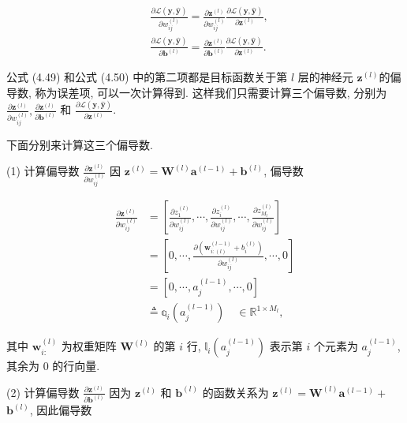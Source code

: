 \documentclass[10pt]{article}
\begin{document}
\begin{align*}
& \frac{\partial \mathcal{L}(\boldsymbol{y}, \hat{\boldsymbol{y}})}{\partial w_{i j}^{(l)}}=\frac{\partial \boldsymbol{z}^{(l)}}{\partial w_{i j}^{(l)}} \frac{\partial \mathcal{L}(\boldsymbol{y}, \hat{\boldsymbol{y}})}{\partial \boldsymbol{z}^{(l)}},  \tag{4.49}\\
& \frac{\partial \mathcal{L}(\boldsymbol{y}, \hat{\boldsymbol{y}})}{\partial \boldsymbol{b}^{(l)}}=\frac{\partial \boldsymbol{z}^{(l)}}{\partial \boldsymbol{b}^{(l)}} \frac{\partial \mathcal{L}(\boldsymbol{y}, \hat{\boldsymbol{y}})}{\partial \boldsymbol{z}^{(l)}} . \tag{4.50}
\end{align*}


公式 (4.49) 和公式 (4.50) 中的第二项都是目标函数关于第 $l$ 层的神经元 $\boldsymbol{z}^{(l)}$的偏导数, 称为误差项, 可以一次计算得到. 这样我们只需要计算三个偏导数, 分别为 $\frac{\partial \boldsymbol{z}^{(l)}}{\partial w_{i j}^{(l)}}, \frac{\partial \boldsymbol{z}^{(l)}}{\partial \boldsymbol{b}^{(l)}}$ 和 $\frac{\partial \mathcal{L}(\boldsymbol{y}, \hat{\boldsymbol{y}})}{\partial \boldsymbol{z}^{(l)}}$.

下面分别来计算这三个偏导数.

(1) 计算偏导数 $\frac{\partial \boldsymbol{z}^{(l)}}{\partial w_{i j}^{(l)}}$ 因 $\boldsymbol{z}^{(l)}=\boldsymbol{W}^{(l)} \boldsymbol{a}^{(l-1)}+\boldsymbol{b}^{(l)}$, 偏导数


\begin{align*}
\frac{\partial \boldsymbol{z}^{(l)}}{\partial w_{i j}^{(l)}} & =\left[\frac{\partial z_{1}^{(l)}}{\partial w_{i j}^{(l)}}, \cdots, \frac{\partial z_{i}^{(l)}}{\partial w_{i j}^{(l)}}, \cdots, \frac{\partial z_{M_{l}}^{(l)}}{\partial w_{i j}^{(l)}}\right]  \tag{4.51}\\
& =\left[0, \cdots, \frac{\partial\left(\boldsymbol{w}_{i:(l)}^{(l-1)}+b_{i}^{(l)}\right)}{\partial w_{i j}^{(l)}}, \cdots, 0\right]  \tag{4.52}\\
& =\left[0, \cdots, a_{j}^{(l-1)}, \cdots, 0\right]  \tag{4.53}\\
& \triangleq \mathbb{q}_{i}\left(a_{j}^{(l-1)}\right) \quad \in \mathbb{R}^{1 \times M_{l}}, \tag{4.54}
\end{align*}


其中 $\boldsymbol{w}_{i:}^{(l)}$ 为权重矩阵 $\boldsymbol{W}^{(l)}$ 的第 $i$ 行, $\mathbb{l}_{i}\left(a_{j}^{(l-1)}\right)$ 表示第 $i$ 个元素为 $a_{j}^{(l-1)}$, 其余为 0 的行向量.

(2) 计算偏导数 $\frac{\partial \boldsymbol{z}^{(l)}}{\partial \boldsymbol{b}^{(l)}}$ 因为 $\boldsymbol{z}^{(l)}$ 和 $\boldsymbol{b}^{(l)}$ 的函数关系为 $\boldsymbol{z}^{(l)}=\boldsymbol{W}^{(l)} \boldsymbol{a}^{(l-1)}+$ $\boldsymbol{b}^{(l)}$, 因此偏导数
\end{document}

